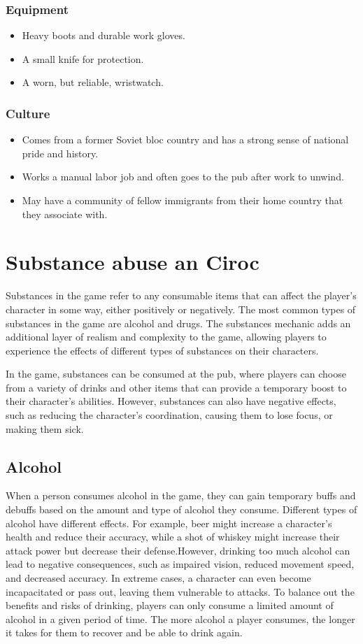 \documentclass{book}
\begin{document}
\subsubsection{Equipment}
\begin{itemize}
    \item Heavy boots and durable work gloves.
    \item A small knife for protection.
    \item A worn, but reliable, wristwatch.
\end{itemize}
\subsubsection{Culture}
\begin{itemize}
    \item Comes from a former Soviet bloc country and has a strong sense of national pride and history.
    \item Works a manual labor job and often goes to the pub after work to unwind.
    \item May have a community of fellow immigrants from their home country that they associate with.
\end{itemize}

\section{Substance abuse an Ciroc}
Substances in the game refer to any consumable items that can affect the player's character in some way, either positively or negatively. The most common types of substances in the game are alcohol and drugs. The substances mechanic adds an additional layer of realism and complexity to the game, allowing players to experience the effects of different types of substances on their characters.

In the game, substances can be consumed at the pub, where players can choose from a variety of drinks and other items that can provide a temporary boost to their character's abilities. However, substances can also have negative effects, such as reducing the character's coordination, causing them to lose focus, or making them sick.

\subsection{Alcohol}
When a person consumes alcohol in the game, they can gain temporary buffs and debuffs based on the amount and type of alcohol they consume. Different types of alcohol have different effects. For example, beer might increase a character's health and reduce their accuracy, while a shot of whiskey might increase their attack power but decrease their defense.However, drinking too much alcohol can lead to negative consequences, such as impaired vision, reduced movement speed, and decreased accuracy. In extreme cases, a character can even become incapacitated or pass out, leaving them vulnerable to attacks. To balance out the benefits and risks of drinking, players can only consume a limited amount of alcohol in a given period of time. The more alcohol a player consumes, the longer it takes for them to recover and be able to drink again.
\end{document}
